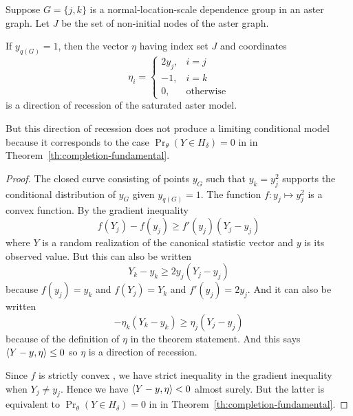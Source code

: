 \begin{theorem} \label{th:dor-normal}
Suppose $G = \{j, k\}$ is a normal-location-scale dependence group
in an aster graph.
Let $J$ be the set of non-initial nodes of the aster graph.

If $y_{q(G)} = 1$, then the vector $\eta$ having index set $J$
and coordinates
\begin{equation} \label{eq:dor-normal}
   \eta_i = \begin{cases} 2 y_j, & i = j \\
   -1, & i = k \\
   0, & \text{otherwise} \end{cases}
\end{equation}
is a direction of recession of the saturated aster model.

But this direction of recession does not produce a limiting conditional model
because it corresponds to the case $\Pr_\theta(Y \in H_\delta) = 0$ in
in Theorem~\ref{th:completion-fundamental}.
\end{theorem}
\begin{proof}
The closed curve consisting of points $y_G$ such that $y_k = y_j^2$
supports the conditional distribution of $y_G$ given $y_{q(G)} = 1$.
The function $f : y_j \mapsto y_j^2$ is a convex function.
By the gradient inequality \citep[Theorem~2.13 (b)]{rockafellar-wets}
$$
   f(Y_j) - f(y_j) \ge f'(y_j) (Y_j - y_j)
$$
where $Y$ is a random realization of the canonical statistic vector and
$y$ is its observed value.  But this can also be written
$$
   Y_k - y_k \ge 2 y_j (Y_j - y_j)
$$
because $f(y_j) = y_k$ and $f(Y_j) = Y_k$ and $f'(y_j) = 2 y_j$.
And it can also be written
$$
   - \eta_k (Y_k - y_k) \ge \eta_j (Y_j - y_j)
$$
because of the definition of $\eta$ in the theorem statement.
And this says $\langle Y - y, \eta \rangle \le 0$ so $\eta$ is a direction of
recession.

Since $f$ is strictly convex
\citep[Theorem~2.13 ($\text{a}'$)]{rockafellar-wets},
we have strict inequality in the gradient inequality
\citep[Theorem~2.13 ($\text{b}'$)]{rockafellar-wets} when $Y_j \neq y_j$.
Hence we have \hbox{$\langle Y - y, \eta \rangle < 0$} almost surely.
But the latter is equivalent to $\Pr_\theta(Y \in H_\delta) = 0$ in
in Theorem~\ref{th:completion-fundamental}.
\end{proof}

\REVISED

